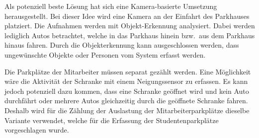 Als potenziell beste Lösung hat sich eine Kamera-basierte Umsetzung herausgestellt.
Bei dieser Idee wird eine Kamera an der Einfahrt des Parkhauses platziert.
Die Aufnahmen werden mit Objekt-Erkennung analysiert.
Dabei werden lediglich Autos betrachtet, welche in das Parkhaus hinein bzw.\ aus dem Parkhaus hinaus fahren.
Durch die Objekterkennung kann ausgeschlossen werden, dass ungewünschte Objekte oder Personen vom System erfasst werden.

Die Parkplätze der Mitarbeiter müssen separat gezählt werden.
Eine Möglichkeit wäre die Aktivität der Schranke mit einem Neigungssensor zu erfassen.
Es kann jedoch potenziell dazu kommen, dass eine Schranke geöffnet wird und kein Auto durchfährt oder mehrere Autos gleichzeitig durch die geöffnete Schranke fahren.
Deshalb wird für die Zählung der Auslastung der Mitarbeiterparkplätze dieselbe Variante verwendet, welche für die Erfassung der Studentenparkplätze vorgeschlagen wurde.

